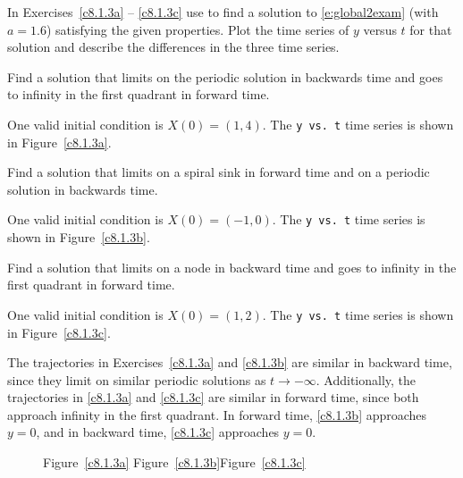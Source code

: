 \documentclass{ximera}
\begin{document}
\noindent In Exercises~\ref{c8.1.3a} -- \ref{c8.1.3c} use {\pplane}
to find a solution to \eqref{e:global2exam} (with $a=1.6$) satisfying the 
given properties. Plot the time series of $y$ versus $t$ for that solution 
and describe the differences in the three time series.
\begin{computerExercise} \label{c8.1.3a}
Find a solution that limits on the periodic solution in backwards time and 
goes to infinity in the first quadrant in forward time.

\begin{solution}

One valid initial condition is $X(0) = (1,4)$.  The {\tt y vs.\ t}
time series is shown in Figure~\ref{c8.1.3a}.

\end{solution}
\end{computerExercise}
\begin{computerExercise} \label{c8.1.3b}
Find a solution that limits on a spiral sink in forward time and on a periodic 
solution in backwards time.

\begin{solution}

One valid initial condition is $X(0) = (-1,0)$.  The {\tt y vs.\ t}
time series is shown in Figure~\ref{c8.1.3b}.


\end{solution}
\end{computerExercise}
\begin{computerExercise} \label{c8.1.3c}
Find a solution that limits on a node in backward time and goes to infinity 
in the first quadrant in forward time.

\begin{solution}
One valid initial condition is $X(0) = (1,2)$.  The
{\tt y vs.\ t} time series is shown in Figure~\ref{c8.1.3c}.

\para The trajectories in Exercises~\ref{c8.1.3a} and \ref{c8.1.3b} are
similar in backward time, since they limit on similar periodic
solutions as $t \rightarrow -\infty$.  Additionally, the trajectories
in \ref{c8.1.3a} and \ref{c8.1.3c} are similar in forward time, since
both approach infinity in the first quadrant.  In forward time,
\ref{c8.1.3b} approaches $y = 0$, and in backward time, \ref{c8.1.3c}
approaches $y = 0$.

\begin{figure}[htb]
                       \centerline{%
                       }
		\centerline{Figure~\ref{c8.1.3a}\hspace{1.2in}
Figure~\ref{c8.1.3b}\hspace{1.2in}Figure~\ref{c8.1.3c}}
\end{figure}




\end{solution}
\end{computerExercise}
\end{document}
